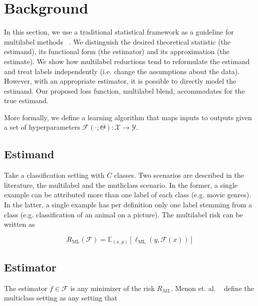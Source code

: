 
\section{Background}
\label{section:background}

In this section, we use a traditional statistical framework as a guideline for multilabel methods~\citep{tukey} . We distinguish the desired theoretical statistic (the estimand), its functional form (the estimator) and its approximation (the estimate). We show how multilabel reductions tend to reformulate the estimand and treat labels independently (i.e. change the assumptions about the data). However, with an appropriate estimator, it is possible to directly model the estimand. Our proposed loss function, multilabel blend, accommodates for the true estimand.

More formally, we define a learning algorithm that maps inputs to outputs given a set of hyperparameters \(\mathcal{F}(\cdot ; \Theta): \mathcal{X} \rightarrow \mathcal{Y}\). 

\subsection{Estimand}
\label{section:background:estimand}

Take a classification setting with $C$ classes. Two scenarios are described in the literature, the multilabel and the mutliclass scenario. In the former, a single example can be attributed more than one label of each class (e.g. movie genres). In the latter, a single example has per definition only one label stemming from a class (e.g. classification of an animal on a picture). The multilabel risk can be written as

\begin{equation}
R_{\mathrm{ML}}(\mathcal{F}) = \mathbb{E}_{(x, y)}\left[\ell_{\mathrm{ML}}(y, \mathcal{F}(x))\right]
\end{equation}


\subsection{Estimator}
\label{section:background:estimator}

The estimator $f \in \mathcal{F}$ is any minimizer of the risk $R_{ML}$. 
Menon et. al. ~\citep{multilabelReduction} define the multiclass setting as any setting that 

